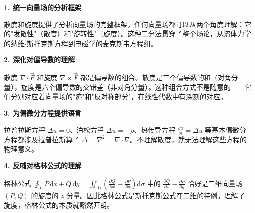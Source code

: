 \begin{connectionbox}
\textbf{1. 统一向量场的分析框架}

散度和旋度提供了分析向量场的完整框架。任何向量场都可以从两个角度理解：它的"发散性"（散度）和"旋转性"（旋度）。这种二分法贯穿了整个场论，从流体力学的纳维-斯托克斯方程到电磁学的麦克斯韦方程组。

\textbf{2. 深化对偏导数的理解}

散度 $\nabla\cdot\vec{F}$ 和旋度 $\nabla\times\vec{F}$ 都是偏导数的组合。散度是三个偏导数的和（对角分量），旋度是六个偏导数的交错差（非对角分量）。这种组合方式不是随意的——它们分别对应着向量场的"迹"和"反对称部分"，在线性代数中有深刻的对应。

\textbf{3. 为偏微分方程提供语言}

拉普拉斯方程 $\Delta u = 0$、泊松方程 $\Delta u = -\rho$、热传导方程 $\frac{\partial u}{\partial t} = \Delta u$ 等基本偏微分方程都涉及拉普拉斯算子 $\Delta = \nabla^2 = \nabla\cdot\nabla$。不理解散度，就无法理解这些方程的物理意义。

\textbf{4. 反哺对格林公式的理解}

格林公式 $\oint_L P\,\mathrm{d}x + Q\,\mathrm{d}y = \iint_D \left(\frac{\partial Q}{\partial x}-\frac{\partial P}{\partial y}\right)\mathrm{d}\sigma$ 中的 $\frac{\partial Q}{\partial x}-\frac{\partial P}{\partial y}$ 恰好是二维向量场 $(P,Q)$ 的旋度的 $z$ 分量。因此格林公式是斯托克斯公式在二维的特例。理解了旋度，格林公式的本质就豁然开朗。
\end{connectionbox}
